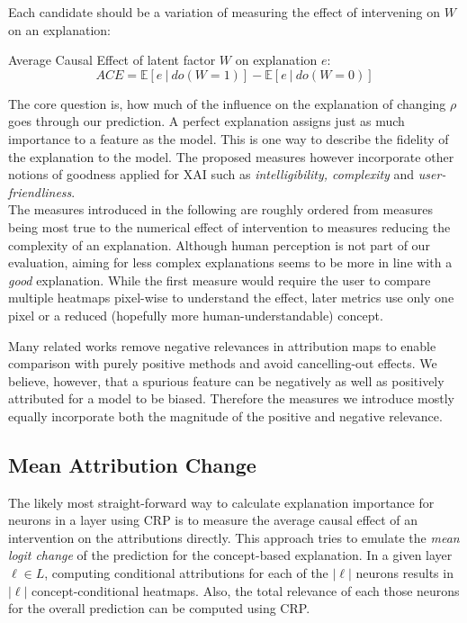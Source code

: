 Each candidate should be a variation of measuring the effect of intervening on $W$ on an explanation:
\begin{center}
Average Causal Effect of latent factor $W$ on explanation $e$: \\
\begin{equation}
\displaystyle ACE = \mathbb{E} [e \ | \ do(W=1) ] - \mathbb{E} [ e \ | \ do(W=0) ]
\end{equation}
\end{center}
The core question is, how much of the influence on the explanation of changing $\rho$ goes through our prediction. A perfect explanation assigns just as much importance to a feature as the model. This is one way to describe the fidelity of the explanation to the model. The proposed measures however incorporate other notions of goodness applied for XAI such as \textit{intelligibility, complexity} and \textit{user-friendliness}. \\

The measures introduced in the following are roughly ordered from measures being most true to the numerical effect of intervention to measures reducing the complexity of an explanation. Although human perception is not part of our evaluation, aiming for less complex explanations seems to be more in line with a \textit{good} explanation. While the first measure would require the user to compare multiple heatmaps pixel-wise to understand the effect, later metrics use only one pixel or a reduced (hopefully more human-understandable) concept. 

Many related works remove negative relevances in attribution maps to enable comparison with purely positive methods and avoid cancelling-out effects. We believe, however, that a spurious feature can be negatively as well as positively attributed for a model to be biased. Therefore the measures we introduce mostly equally incorporate both the magnitude of the positive and negative relevance. 

\subsection{Mean Attribution Change}
The likely most straight-forward way to calculate explanation importance for neurons in a layer using CRP is to measure the average causal effect of an intervention on the attributions directly. This approach tries to emulate the \textit{mean logit change} of the prediction for the concept-based explanation. In a given layer $\ell \in L$, computing conditional attributions for each of the $|\ell|$ neurons results in $|\ell|$ concept-conditional heatmaps. Also, the total relevance of each those neurons for the overall prediction can be computed using CRP.


